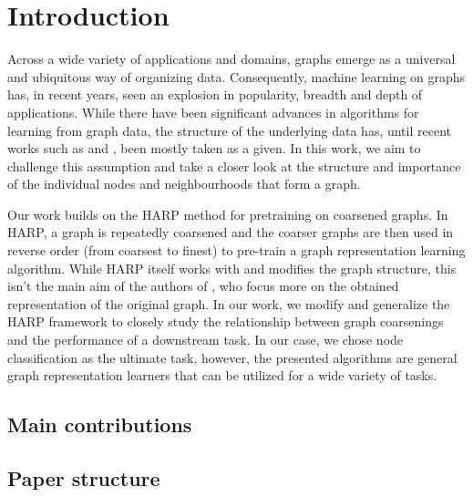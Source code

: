 \section{Introduction}
Across a wide variety of applications and domains, graphs emerge as a universal and ubiquitous way of organizing data. Consequently, machine learning on graphs has, in recent years, seen an explosion in popularity, breadth and depth of applications. While there have been significant advances in algorithms for learning from graph data, the structure of the underlying data has, until recent works such as \cite{topping_understanding_2021} and \cite{velickovic_geometric_2021}, been mostly taken as a given. In this work, we aim to challenge this assumption and take a closer look at the structure and importance of the individual nodes and neighbourhoods that form a graph.

Our work builds on the HARP \cite{chen_harp_2018} method for pretraining on coarsened graphs. In HARP, a graph is repeatedly coarsened and the coarser graphs are then used in reverse order (from coarsest to finest) to pre-train a graph representation learning algorithm. While HARP itself works with and modifies the graph structure, this isn't the main aim of the authors of \cite{chen_harp_2018}, who focus more on the obtained representation of the original graph. In our work, we modify and generalize the HARP framework to closely study the relationship between graph coarsenings and the performance of a downstream task. In our case, we chose node classification as the ultimate task, however, the presented algorithms are general graph representation learners that can be utilized for a wide variety of tasks.

\subsection{Main contributions}

\subsection{Paper structure}
